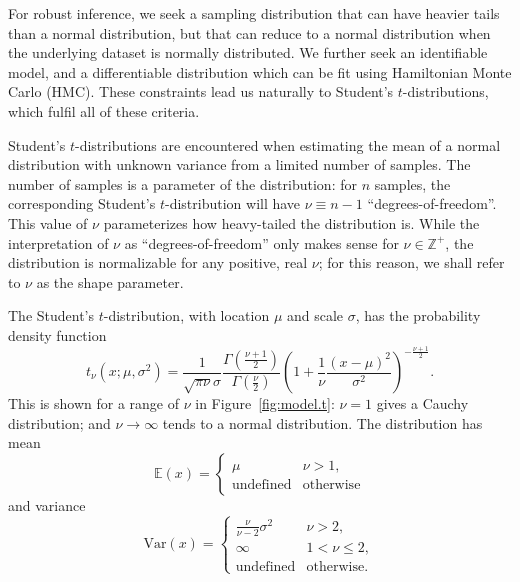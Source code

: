 \documentclass[fleqn,usenatbib]{rasti}
\begin{document}
For robust inference, we seek a sampling distribution that can have heavier
tails than a normal distribution, but that can reduce to a normal distribution
when the underlying dataset is normally distributed. We further seek an
identifiable model, and a differentiable distribution which can be fit using
Hamiltonian Monte Carlo (HMC). These constraints lead us naturally to Student's
$t$-distributions, which fulfil all of these criteria.

Student's $t$-distributions are encountered when estimating the mean of a normal
distribution with unknown variance from a limited number of samples. The number
of samples is a parameter of the distribution: for $n$ samples, the
corresponding Student's $t$-distribution will have $\nu \equiv n - 1$
``degrees-of-freedom''. This value of $\nu$ parameterizes how heavy-tailed the
distribution is. While the interpretation of $\nu$ as ``degrees-of-freedom''
only makes sense for $\nu \in \mathbb Z^+$, the distribution is normalizable for
any positive, real $\nu$; for this reason, we shall refer to $\nu$ as the shape
parameter.

The Student's $t$-distribution, with location $\mu$ and scale $\sigma$, has
the probability density function
\begin{equation}
    t_{\nu} \left(x; {\mu}, {\sigma^2}\right)
        =
    \frac{1}{\sqrt{\pi \nu} \sigma}
    \frac{
        \Gamma \left(\frac{\nu + 1}2\right)
    }{
        \Gamma \left(\frac{\nu}2\right)
    }
    \left(
        1 + \frac{1}{\nu} \frac{\left(x - \mu\right)^2}{\sigma^2}
    \right)^{
        -\frac{\nu + 1}{2}
    }.
\end{equation}
This is shown for a range of $\nu$ in Figure~\ref{fig:model.t}: $\nu
= 1$ gives a Cauchy distribution; and $\nu \rightarrow \infty$ tends to a normal
distribution. The distribution has mean
\begin{equation}
    \mathbb{E}(x)
        =
    \begin{cases}
        \mu & \nu > 1, \\
        \textrm{undefined} & \textrm{otherwise}
    \end{cases}
\end{equation}
and variance
\begin{equation}
    \mathrm{Var}(x)
        =
    \begin{cases}
        \frac{\nu}{\nu - 2} \sigma^2 & \nu > 2, \\
        \infty & 1 < \nu \leq 2, \\
        \textrm{undefined} & \textrm{otherwise.}
    \end{cases}
\end{equation}
\end{document}

